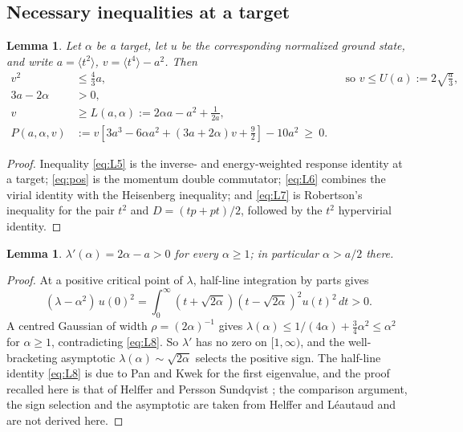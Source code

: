 \documentclass[11pt,reqno]{amsart}
\theoremstyle{plain}
\newtheorem{lemma}[theorem]{Lemma}
\theoremstyle{definition}
\theoremstyle{remark}
\numberwithin{equation}{section}
\begin{document}
\subsection{Necessary inequalities at a target}

\begin{lemma}
  \label{lem:target-ineq}
  Let $\alpha$ be a target, let $u$ be the corresponding normalized ground
  state, and write $a=\langle t^2\rangle$, $v=\langle t^4\rangle-a^2$. Then
  \begin{align}
    \label{eq:L5}
    v^2&\le\frac43a,
    &&\text{so } v\le U(a):=2\sqrt{\frac a3},\\
    \label{eq:pos}
    3a-2\alpha&>0,\\
    \label{eq:L6}
    v&\ge L(a,\alpha):=2\alpha a-a^2+\frac1{2a},\\
    \label{eq:L7}
    P(a,\alpha,v)&:=
      v\left[3a^3-6\alpha a^2+(3a+2\alpha)v+\frac92\right]-10a^2\ \ge\ 0 .
  \end{align}
\end{lemma}

\begin{proof}
  Inequality \eqref{eq:L5} is the inverse- and energy-weighted response
  identity at a target; \eqref{eq:pos} is the momentum double commutator;
  \eqref{eq:L6} combines the virial identity with the Heisenberg
  inequality; and \eqref{eq:L7} is Robertson's inequality for the pair
  $t^2$ and $D=(tp+pt)/2$, followed by the $t^2$ hypervirial identity.
\end{proof}

\begin{lemma}
  \label{lem:lambda-prime}
  $\lambda'(\alpha)=2\alpha-a>0$ for every $\alpha\ge1$; in particular
  $\alpha>a/2$ there.
\end{lemma}

\begin{proof}
  At a positive critical point of $\lambda$, half-line integration by parts
  gives
  \begin{equation}
    \label{eq:L8}
    (\lambda-\alpha^2)\,u(0)^2
    =\int_0^\infty (t+\sqrt{2\alpha})(t-\sqrt{2\alpha})^2u(t)^2\,dt>0 .
  \end{equation}
  A centred Gaussian of width $\rho=(2\alpha)^{-1}$ gives
  $\lambda(\alpha)\le1/(4\alpha)+\tfrac34\alpha^2\le\alpha^2$ for
  $\alpha\ge1$, contradicting \eqref{eq:L8}. So $\lambda'$ has no zero on
  $[1,\infty)$, and the well-bracketing asymptotic
  $\lambda(\alpha)\sim\sqrt{2\alpha}$ selects the positive sign. The
  half-line identity \eqref{eq:L8} is due to Pan and Kwek \cite{Pan_2002so}
  for the first eigenvalue, and the proof recalled here is that of Helffer and
  Persson Sundqvist \cite{Helffer_2010sp}; the comparison argument, the sign
  selection and the asymptotic are taken from Helffer and L\'eautaud
  \cite{Helffer_2024oc} and are not derived here.
\end{proof}
\end{document}
